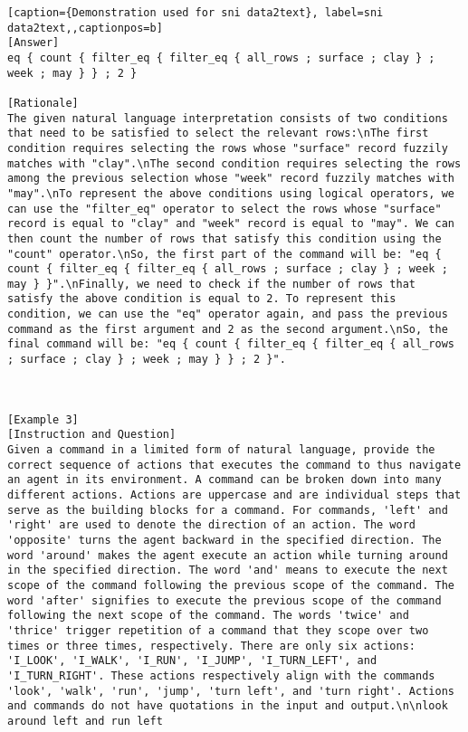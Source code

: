 \begin{lstlisting}[caption={Demonstration used for sni data2text}, label=sni data2text,,captionpos=b]
[Answer]
eq { count { filter_eq { filter_eq { all_rows ; surface ; clay } ; week ; may } } ; 2 }

[Rationale]
The given natural language interpretation consists of two conditions that need to be satisfied to select the relevant rows:\nThe first condition requires selecting the rows whose "surface" record fuzzily matches with "clay".\nThe second condition requires selecting the rows among the previous selection whose "week" record fuzzily matches with "may".\nTo represent the above conditions using logical operators, we can use the "filter_eq" operator to select the rows whose "surface" record is equal to "clay" and "week" record is equal to "may". We can then count the number of rows that satisfy this condition using the "count" operator.\nSo, the first part of the command will be: "eq { count { filter_eq { filter_eq { all_rows ; surface ; clay } ; week ; may } }".\nFinally, we need to check if the number of rows that satisfy the above condition is equal to 2. To represent this condition, we can use the "eq" operator again, and pass the previous command as the first argument and 2 as the second argument.\nSo, the final command will be: "eq { count { filter_eq { filter_eq { all_rows ; surface ; clay } ; week ; may } } ; 2 }".



[Example 3]
[Instruction and Question]
Given a command in a limited form of natural language, provide the correct sequence of actions that executes the command to thus navigate an agent in its environment. A command can be broken down into many different actions. Actions are uppercase and are individual steps that serve as the building blocks for a command. For commands, 'left' and 'right' are used to denote the direction of an action. The word 'opposite' turns the agent backward in the specified direction. The word 'around' makes the agent execute an action while turning around in the specified direction. The word 'and' means to execute the next scope of the command following the previous scope of the command. The word 'after' signifies to execute the previous scope of the command following the next scope of the command. The words 'twice' and 'thrice' trigger repetition of a command that they scope over two times or three times, respectively. There are only six actions: 'I_LOOK', 'I_WALK', 'I_RUN', 'I_JUMP', 'I_TURN_LEFT', and 'I_TURN_RIGHT'. These actions respectively align with the commands 'look', 'walk', 'run', 'jump', 'turn left', and 'turn right'. Actions and commands do not have quotations in the input and output.\n\nlook around left and run left


\end{lstlisting}
